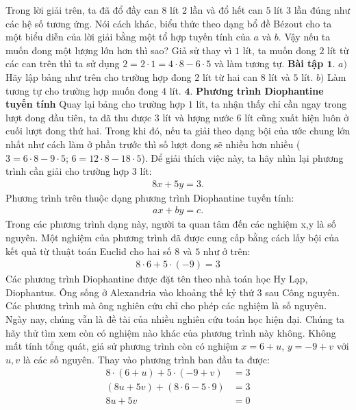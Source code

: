 \begin{multicols}{2}
	Trong lời giải trên, ta đã đổ đầy can $8$ lít $2$ lần và đổ hết can $5$ lít $3$ lần đúng như các hệ số tương ứng. Nói cách khác, biểu thức theo dạng bổ đề Bézout cho ta một biểu diễn của lời giải bằng một tổ hợp tuyến tính của $a$ và $b$.
	\vskip 0.1cm
	Vậy nếu ta muốn đong một lượng lớn hơn thì sao? Giả sử thay vì $1$ lít, ta muốn đong $2$ lít từ các can trên thì ta sử dụng $2=2\cdot 1=4\cdot 8-6\cdot 5$ và làm tương tự.
	\vskip 0.1cm
	\textbf{\color{hoccungpi}Bài tập $\pmb{1.}$}
	$a)$ Hãy lập bảng như trên cho trường hợp đong $2$ lít từ hai can $8$ lít và $5$ lít.
	\vskip 0.1cm
	$b)$ Làm tương tự cho trường hợp muốn đong $4$ lít.
	\vskip 0.1cm
	$\pmb{4.}$ \textbf{\color{hoccungpi}Phương trình Diophantine tuyến tính}
	\vskip 0.1cm
	Quay lại bảng cho trường hợp $1$ lít, ta nhận thấy chỉ cần ngay trong lượt đong đầu tiên, ta đã thu được $3$ lít và lượng nước 6 lít cũng xuất hiện luôn ở cuối lượt đong thứ hai. Trong khi đó, nếu ta giải theo dạng bội của ước chung lớn nhất như cách làm ở phần trước thì số lượt đong sẽ nhiều hơn nhiều ($3=6\cdot 8-9\cdot 5$; $6=12\cdot 8-18\cdot 5$).
	\vskip 0.1cm
	Để giải thích việc này, ta hãy nhìn lại phương trình cần giải cho trường hợp $3$ lít:
	\begin{align*}
		8x+5y=3.	\tag{$4$}
	\end{align*}
	Phương trình trên thuộc dạng phương trình Diophantine tuyến tính: 
	\begin{align*}
		ax+by=c.
	\end{align*}
	Trong các phương trình dạng này, người ta quan tâm đến các nghiệm x,y là số nguyên. Một nghiệm của phương trình đã được cung cấp bằng cách lấy bội của kết quả từ thuật toán Euclid cho hai số $8$ và $5$ như ở trên:
	\begin{align*}
		8\cdot 6+5\cdot (-9)=3
	\end{align*}
	Các phương trình Diophantine được đặt tên theo nhà toán học Hy Lạp, Diophantus. Ông sống ở Alexandria vào khoảng thế kỷ thứ $3$ sau Công nguyên. Các phương trình mà ông nghiên cứu chỉ cho phép các nghiệm là số nguyên. Ngày nay, chúng vẫn là đề tài của nhiều nghiên cứu toán học hiện đại.
	\vskip 0.1cm
	Chúng ta hãy thử tìm xem còn có nghiệm nào khác của phương trình này không. Không mất tính tổng quát, giả sử phương trình còn có nghiệm $x=6+u$, $y=-9+v$ với $u,v$ là các số nguyên. Thay vào phương trình ban đầu ta được:
	\begin{align*}
		8\cdot (6+u)+5\cdot (-9+v)&=3\\
		(8u+5v)+(8\cdot 6-5\cdot 9)&=3\\
		8u+5v&=0		\tag{$5$}

\end{align*}
\end{multicols}
